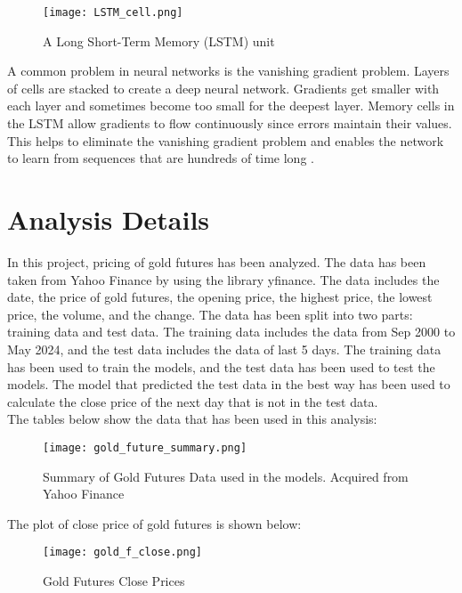 \documentclass[12pt, a4paper]{article}
\begin{document}
\begin{figure}[h]
\centering
\texttt{[image: LSTM\_cell.png]}
\caption{A Long Short-Term Memory (LSTM) unit \cite{6}}
\label{fig:LSTM_cell}
\end{figure}

A common problem in neural networks is the vanishing gradient problem.  Layers of cells are stacked to create a deep neural network.  Gradients get smaller with each layer and sometimes become too small for the deepest layer.  Memory cells in the LSTM allow gradients to flow continuously since errors maintain their values.  This helps to eliminate the vanishing gradient problem and enables the network to learn from sequences that are hundreds of time long \cite{6}.

\section{Analysis Details}
In this project, pricing of gold futures has been analyzed.  The data has been taken from Yahoo Finance by using the library yfinance.  The data includes the date, the price of gold futures, the opening price, the highest price, the lowest price, the volume, and the change.  The data has been split into two parts: training data and test data.  The training data includes the data from Sep 2000 to May 2024, and the test data includes the data of last 5 days.  The training data has been used to train the models, and the test data has been used to test the models.    The model that predicted the test data in the best way has been used to calculate the close price of the next day that is not in the test data.\\

The tables below show the data that has been used in this analysis:\\

\begin{figure}[h]
\centering
\texttt{[image: gold\_future\_summary.png]}
\caption{Summary of Gold Futures Data used in the models.  Acquired from Yahoo Finance}
\label{fig:gold_future_summary}
\end{figure}

The plot of close price of gold futures is shown below:\\

\begin{figure}[h]
\centering
\texttt{[image: gold\_f\_close.png]}
\caption{Gold Futures Close Prices}
\label{fig:gold_f_close}
\end{figure}
\end{document}
